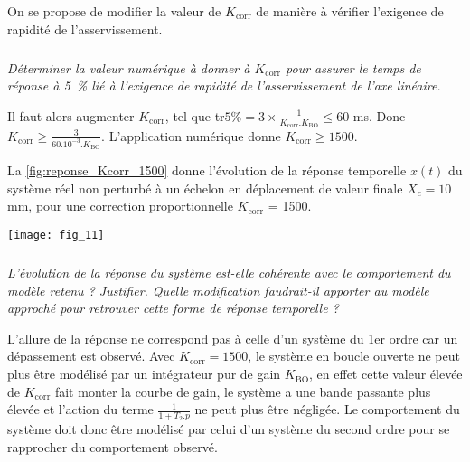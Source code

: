 \begin{multicols}{2}
\ifprof
\else
\vspace*{1em}
On se propose de modifier la valeur de $K_{\text{corr}}$ de manière à vérifier l'exigence de rapidité de l'asservissement.
\fi

\subparagraph{}\textit{Déterminer la valeur numérique à donner à $K_{\text{corr}}$ pour assurer le temps de réponse à 5\ \% lié à l'exigence de rapidité de l'asservissement de l'axe linéaire.}

\ifprof
\begin{corrige}
Il faut alors augmenter $K_{\text{corr}}$, tel que tr$5\% = 3 \times \frac{1}{K_{\text{corr}}.K_{\text{BO}}} \le 60$ ms. Donc \\
$K_{\text{corr}} \ge \frac{3}{60.10^{-3}.K_{\text{BO}}}$.
L'application numérique donne $K_{\text{corr}} \ge  1500$.
\end{corrige}
\fi


\ifprof
\else
La \ref{fig:reponse_Kcorr_1500}  donne l'évolution de la réponse temporelle $x(t)$ du système réel non perturbé à un échelon en déplacement de valeur finale $X_c = 10$ mm, pour une correction proportionnelle $K_{\text{corr}}$ = \num{1500}.


\begin{center}%


\texttt{[image: fig\_11]}
\end{center}
\fi


\subparagraph{}\textit{L'évolution de la réponse du système est-elle cohérente avec le comportement du modèle retenu ? Justifier. Quelle modification faudrait-il apporter au modèle approché pour retrouver cette forme de réponse temporelle ?}

\ifprof
\begin{corrige}
L'allure de la réponse ne correspond pas à celle d'un système du 1er ordre car un dépassement est observé. Avec $K_{\text{corr}} = 1500$, le système en boucle ouverte ne peut plus être modélisé par un intégrateur pur de gain $K_{\text{BO}}$, en effet cette valeur élevée de $K_{\text{corr}}$ fait monter la courbe de gain, le système a une bande passante plus élevée et l'action du terme $\frac{1}{1+T_2.p}$ ne peut plus être négligée. Le comportement du système doit donc être modélisé par celui d'un système du second ordre pour se rapprocher du comportement observé.
\end{corrige}
\fi


\end{multicols}
